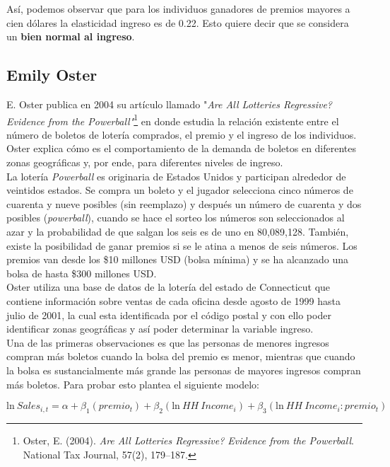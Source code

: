 Así, podemos observar que para los individuos ganadores de premios mayores a cien dólares la elasticidad ingreso es de 0.22. Esto quiere decir que se considera un \textbf{bien normal al ingreso}.

\newpage

\subsection{Emily Oster}

E. Oster publica en 2004 su artículo llamado "\textit{Are All Lotteries Regressive? Evidence from the Powerball"}\footnote{Oster, E. (2004). \textit{Are All Lotteries Regressive? Evidence from the Powerball}. National Tax Journal, 57(2), 179–187.} en donde estudia la relación existente entre el número de boletos de lotería comprados, el premio y el ingreso de los individuos. Oster explica cómo es el comportamiento de la demanda de boletos en diferentes zonas geográficas y, por ende, para diferentes niveles de ingreso. \\

La lotería \textit{Powerball} es originaria de Estados Unidos y participan alrededor de veintidos estados. Se compra un boleto y el jugador selecciona cinco números de cuarenta y nueve posibles (sin reemplazo) y después un número de cuarenta y dos posibles (\textit{powerball}), cuando se hace el sorteo los números son seleccionados al azar y la probabilidad de que salgan los seis es de uno en 80,089,128. También, existe la posibilidad de ganar premios si se le atina a menos de seis números. Los premios van desde los \$10 millones USD (bolsa mínima) y se ha alcanzado una bolsa de hasta \$300 millones USD. \\

Oster utiliza una base de datos de la lotería del estado de Connecticut que contiene información sobre ventas de cada oficina desde agosto de 1999 hasta julio de 2001, la cual esta identificada por el código postal y con ello poder identificar zonas geográficas y así poder determinar la variable ingreso. \\

Una de las primeras observaciones es que las personas de menores ingresos compran más boletos cuando la bolsa del premio es menor, mientras que cuando la bolsa es sustancialmente más grande las personas de mayores ingresos compran más boletos. Para probar esto plantea el siguiente modelo: 

$$
\text{ln} \ Sales_{i,t} = \alpha + \beta_1 (premio_t) + \beta_2 (\text{ln} \ HH \ Income_i) + \beta_3 (\text{ln} \ HH \ Income_i : premio_t)
$$

